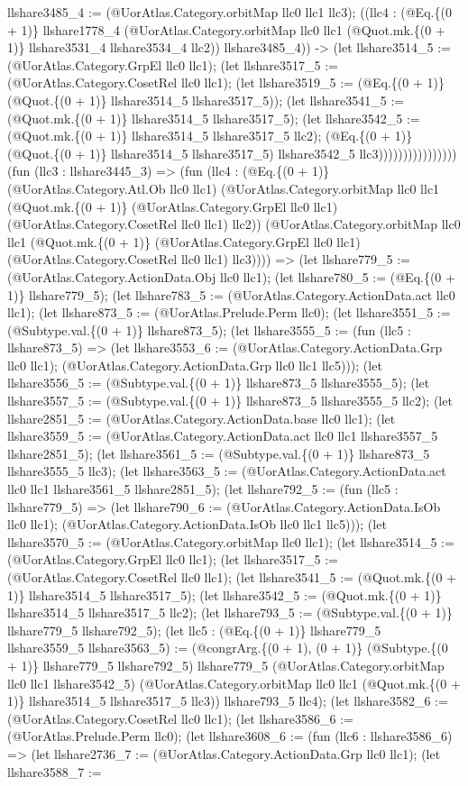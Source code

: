 \documentclass[11pt]{article}
\begin{document}
llshare3485\_4 := (@UorAtlas.Category.orbitMap llc0 llc1 llc3); ((llc4 : (@Eq.\{(0 + 1)\} llshare1778\_4 (@UorAtlas.Category.orbitMap llc0 llc1 (@Quot.mk.\{(0 + 1)\} llshare3531\_4 llshare3534\_4 llc2)) llshare3485\_4)) -> (let llshare3514\_5 := (@UorAtlas.Category.GrpEl llc0 llc1); (let llshare3517\_5 := (@UorAtlas.Category.CosetRel llc0 llc1); (let llshare3519\_5 := (@Eq.\{(0 + 1)\} (@Quot.\{(0 + 1)\} llshare3514\_5 llshare3517\_5)); (let llshare3541\_5 := (@Quot.mk.\{(0 + 1)\} llshare3514\_5 llshare3517\_5); (let llshare3542\_5 := (@Quot.mk.\{(0 + 1)\} llshare3514\_5 llshare3517\_5 llc2); (@Eq.\{(0 + 1)\} (@Quot.\{(0 + 1)\} llshare3514\_5 llshare3517\_5) llshare3542\_5 llc3)))))))))))))))) (fun (llc3 : llshare3445\_3) => (fun (llc4 : (@Eq.\{(0 + 1)\} (@UorAtlas.Category.Atl.Ob llc0 llc1) (@UorAtlas.Category.orbitMap llc0 llc1 (@Quot.mk.\{(0 + 1)\} (@UorAtlas.Category.GrpEl llc0 llc1) (@UorAtlas.Category.CosetRel llc0 llc1) llc2)) (@UorAtlas.Category.orbitMap llc0 llc1 (@Quot.mk.\{(0 + 1)\} (@UorAtlas.Category.GrpEl llc0 llc1) (@UorAtlas.Category.CosetRel llc0 llc1) llc3)))) => (let llshare779\_5 := (@UorAtlas.Category.ActionData.Obj llc0 llc1); (let llshare780\_5 := (@Eq.\{(0 + 1)\} llshare779\_5); (let llshare783\_5 := (@UorAtlas.Category.ActionData.act llc0 llc1); (let llshare873\_5 := (@UorAtlas.Prelude.Perm llc0); (let llshare3551\_5 := (@Subtype.val.\{(0 + 1)\} llshare873\_5); (let llshare3555\_5 := (fun (llc5 : llshare873\_5) => (let llshare3553\_6 := (@UorAtlas.Category.ActionData.Grp llc0 llc1); (@UorAtlas.Category.ActionData.Grp llc0 llc1 llc5))); (let llshare3556\_5 := (@Subtype.val.\{(0 + 1)\} llshare873\_5 llshare3555\_5); (let llshare3557\_5 := (@Subtype.val.\{(0 + 1)\} llshare873\_5 llshare3555\_5 llc2); (let llshare2851\_5 := (@UorAtlas.Category.ActionData.base llc0 llc1); (let llshare3559\_5 := (@UorAtlas.Category.ActionData.act llc0 llc1 llshare3557\_5 llshare2851\_5); (let llshare3561\_5 := (@Subtype.val.\{(0 + 1)\} llshare873\_5 llshare3555\_5 llc3); (let llshare3563\_5 := (@UorAtlas.Category.ActionData.act llc0 llc1 llshare3561\_5 llshare2851\_5); (let llshare792\_5 := (fun (llc5 : llshare779\_5) => (let llshare790\_6 := (@UorAtlas.Category.ActionData.IsOb llc0 llc1); (@UorAtlas.Category.ActionData.IsOb llc0 llc1 llc5))); (let llshare3570\_5 := (@UorAtlas.Category.orbitMap llc0 llc1); (let llshare3514\_5 := (@UorAtlas.Category.GrpEl llc0 llc1); (let llshare3517\_5 := (@UorAtlas.Category.CosetRel llc0 llc1); (let llshare3541\_5 := (@Quot.mk.\{(0 + 1)\} llshare3514\_5 llshare3517\_5); (let llshare3542\_5 := (@Quot.mk.\{(0 + 1)\} llshare3514\_5 llshare3517\_5 llc2); (let llshare793\_5 := (@Subtype.val.\{(0 + 1)\} llshare779\_5 llshare792\_5); (let llc5 : (@Eq.\{(0 + 1)\} llshare779\_5 llshare3559\_5 llshare3563\_5) := (@congrArg.\{(0 + 1), (0 + 1)\} (@Subtype.\{(0 + 1)\} llshare779\_5 llshare792\_5) llshare779\_5 (@UorAtlas.Category.orbitMap llc0 llc1 llshare3542\_5) (@UorAtlas.Category.orbitMap llc0 llc1 (@Quot.mk.\{(0 + 1)\} llshare3514\_5 llshare3517\_5 llc3)) llshare793\_5 llc4); (let llshare3582\_6 := (@UorAtlas.Category.CosetRel llc0 llc1); (let llshare3586\_6 := (@UorAtlas.Prelude.Perm llc0); (let llshare3608\_6 := (fun (llc6 : llshare3586\_6) => (let llshare2736\_7 := (@UorAtlas.Category.ActionData.Grp llc0 llc1); (let llshare3588\_7 := 
\end{document}
